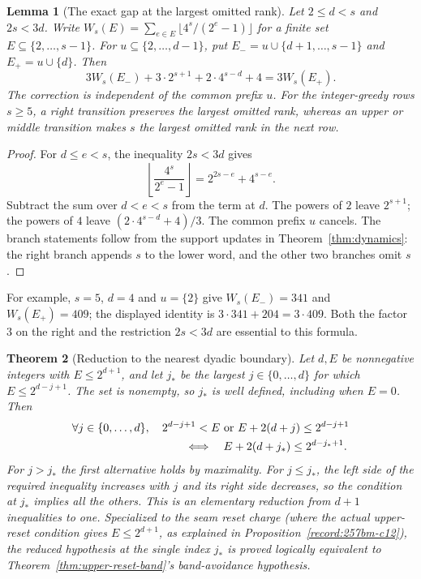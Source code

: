 \documentclass[11pt]{article}
\theoremstyle{plain}
\newtheorem{thm}{Theorem}[section]
\newtheorem{lem}[thm]{Lemma}
\theoremstyle{definition}
\theoremstyle{remark}
\begin{document}
\begin{lem}[The exact gap at the largest omitted rank]
\label{lem:largest-false-rank-algebra}
Let $2\le d<s$ and $2s<3d$.  Write
$W_s(E)=\sum_{e\in E}\lfloor4^s/(2^e-1)\rfloor$ for a finite
set $E\subseteq\{2,\ldots,s-1\}$.  For
$u\subseteq\{2,\ldots,d-1\}$, put
$E_-=u\cup\{d+1,\ldots,s-1\}$ and $E_+=u\cup\{d\}$.
Then
\[
 3W_s(E_-)+3\cdot2^{s+1}+2\cdot4^{s-d}+4=3W_s(E_+).
\]
The correction is independent of the common prefix $u$.
For the integer-greedy rows $s\ge5$, a right transition preserves the
largest omitted rank, whereas an upper or middle transition makes
$s$ the largest omitted rank in the next row.
\end{lem}
\begin{proof}
For $d\le e<s$, the inequality $2s<3d$ gives
\[
 \left\lfloor\frac{4^s}{2^e-1}\right\rfloor
 =2^{2s-e}+4^{s-e}.
\]
Subtract the sum over $d<e<s$ from the term at $d$.  The powers of
$2$ leave $2^{s+1}$; the powers of $4$ leave
$(2\cdot4^{s-d}+4)/3$.  The common prefix $u$ cancels.
The branch statements follow from the support updates in
Theorem~\ref{thm:dynamics}: the right branch appends $s$ to the lower
word, and the other two branches omit $s$.
\end{proof}
For example, $s=5$, $d=4$ and $u=\{2\}$ give
$W_s(E_-)=341$ and $W_s(E_+)=409$; the displayed identity is
$3\cdot341+204=3\cdot409$.  Both the factor $3$ on the right and
the restriction $2s<3d$ are essential to this formula.


\begin{thm}[Reduction to the nearest dyadic boundary]
\label{thm:critical-dyadic-band}
Let $d,E$ be nonnegative integers with $E\le2^{d+1}$, and let $j_*$
be the largest $j\in\{0,\ldots,d\}$ for which $E\le2^{d-j+1}$.
The set is nonempty, so $j_*$ is well defined, including when $E=0$.
Then
\[
 \begin{aligned}
 &\forall j\in\{0,\ldots,d\},\quad
  2^{d-j+1}<E\ \text{or}\ E+2(d+j)\le2^{d-j+1}\\
 &\hspace{35mm}\Longleftrightarrow\quad
 E+2(d+j_*)\le2^{d-j_*+1}.
 \end{aligned}
\]
For $j>j_*$ the first alternative holds by maximality.  For $j\le j_*$,
the left side of the required inequality increases with $j$ and its
right side decreases, so the condition at $j_*$ implies all the others.
This is an elementary reduction from $d+1$ inequalities to one. Specialized to the seam reset charge
(where the actual upper-reset condition gives $E\le2^{d+1}$,
as explained in Proposition~\ref{record:257bm-c12}), the
reduced hypothesis at the single index $j_*$ is proved logically equivalent to
Theorem~\ref{thm:upper-reset-band}'s band-avoidance hypothesis.
\end{thm}
\end{document}
